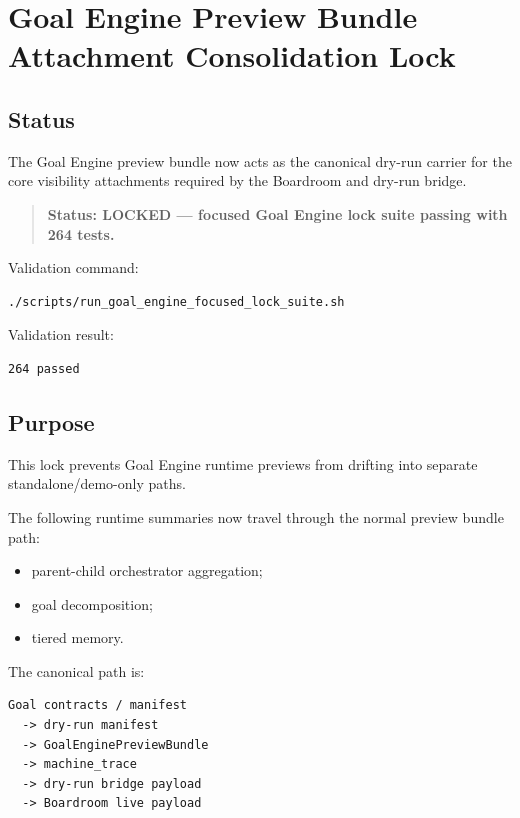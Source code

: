 \section{Goal Engine Preview Bundle Attachment Consolidation Lock}
\label{sec:aion-goal-engine-preview-bundle-attachment-consolidation-lock}

\subsection{Status}

The Goal Engine preview bundle now acts as the canonical dry-run carrier for the core visibility attachments required by the Boardroom and dry-run bridge.

\begin{quote}
\textbf{Status: LOCKED --- focused Goal Engine lock suite passing with 264 tests.}
\end{quote}

Validation command:

\begin{verbatim}
./scripts/run_goal_engine_focused_lock_suite.sh
\end{verbatim}

Validation result:

\begin{verbatim}
264 passed
\end{verbatim}

\subsection{Purpose}

This lock prevents Goal Engine runtime previews from drifting into separate standalone/demo-only paths.

The following runtime summaries now travel through the normal preview bundle path:

\begin{itemize}
  \item parent-child orchestrator aggregation;
  \item goal decomposition;
  \item tiered memory.
\end{itemize}

The canonical path is:

\begin{verbatim}
Goal contracts / manifest
  -> dry-run manifest
  -> GoalEnginePreviewBundle
  -> machine_trace
  -> dry-run bridge payload
  -> Boardroom live payload
\end{verbatim}


